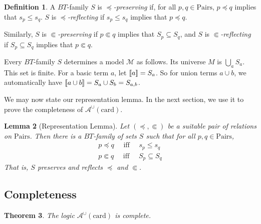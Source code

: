 \documentclass[letterpaper]{article} %
\newtheorem{theorem}{Theorem}[section]
\newtheorem{lemma}[theorem]{Lemma}
\theoremstyle{definition}
\newtheorem{definition}[theorem]{Definition}
\newcommand{\semantics}[1]{[\![\mbox{\em $ #1 $\/}]\!]}
\newcommand{\Model}{\mathcal{M}}
\newcommand{\quadiff}{\quad \mbox{ iff } \quad}
\newcommand{\Aunion}{\mathscr{A}^{\cup}}
\newcommand{\card}{\mathrm{card}}
\newcommand{\Pairs}{\mbox{Pairs}}
\newcommand{\precsubseteq}{\Subset}
\begin{document}
\begin{definition}\label{def-family-model}
A $BT$-family $S$ is \emph{$\preceq$-preserving} if, for all $p,q \in \Pairs$, $p \preceq q$ implies that $s_{p} \le s_{q}$.  $S$ is \emph{$\preceq$-reflecting} if $s_{p} \le s_{q}$ implies that $p \preceq q$.

Similarly, $S$ is \emph{$\precsubseteq$-preserving}
if $p \precsubseteq q$ implies that $S_{p} \subseteq S_{q}$, and 
$S$ is \emph{$\precsubseteq$-reflecting} if 
$S_{p} \subseteq S_{q}$ implies that $p \precsubseteq  q$. 

Every $BT$-family $S$ determines
a  model $\Model$ as follows.  Its universe $M$ is  $\bigcup_{a} S_a$.
This set is finite.
For a basic term  $a$, let $\semantics{a} = S_{a}$. 
So  for union terms $a\cup b$, we
automatically
have $\semantics{a\cup b} = S_{a} \cup S_{b} = S_{a,b}$.
\end{definition}


We may now state our representation lemma.  In the next section, we use it to prove the completeness of $\Aunion(\card)$.

\begin{lemma} [Representation Lemma]
Let $(\preceq, \precsubseteq)$ be a suitable pair of relations on $\Pairs$.
Then there is a $BT$-family of sets $S$
such that for all $p,q\in\Pairs$,
\begin{align}
\label{goal-main1-first}
p \preceq q \quadiff 
 s_{p}\leq s_q  \\
\label{goal-main2-first} 
 p \precsubseteq  q \quadiff 
S_{p}\subseteq S_{q}
 \end{align}
 That is, $S$ preserves and reflects $\preceq$ and $\precsubseteq$.
 \label{lemma-representation}
 \end{lemma}

\subsection{Completeness}
\label{section-completeness}

\begin{theorem}
The logic $\Aunion(\card)$ is complete.
\label{theorem-completeness-Aunioncard}
\end{theorem}
\end{document}
